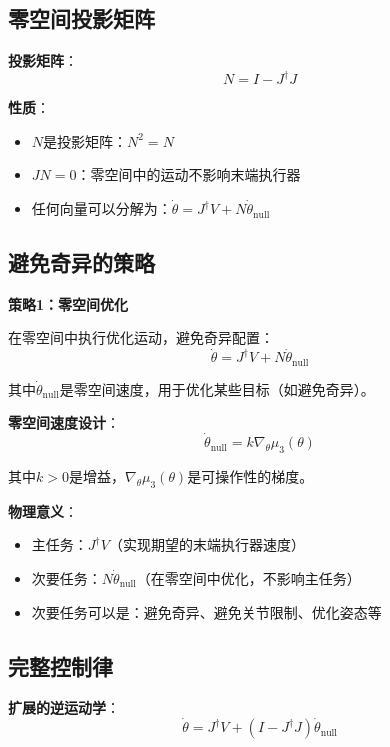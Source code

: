 \documentclass[12pt,a4paper]{article}
\begin{document}
\subsection{零空间投影矩阵}

\textbf{投影矩阵}：
\begin{equation}
N = I - J^{\dagger}J
\end{equation}

\textbf{性质}：
\begin{itemize}
\item $N$是投影矩阵：$N^2 = N$
\item $JN = 0$：零空间中的运动不影响末端执行器
\item 任何向量可以分解为：$\dot{\theta} = J^{\dagger}V + N\dot{\theta}_{\text{null}}$
\end{itemize}

\subsection{避免奇异的策略}

\textbf{策略1：零空间优化}

在零空间中执行优化运动，避免奇异配置：
\begin{equation}
\dot{\theta} = J^{\dagger}V + N\dot{\theta}_{\text{null}}
\end{equation}

其中$\dot{\theta}_{\text{null}}$是零空间速度，用于优化某些目标（如避免奇异）。

\textbf{零空间速度设计}：
\begin{equation}
\dot{\theta}_{\text{null}} = k \nabla_{\theta} \mu_3(\theta)
\end{equation}

其中$k > 0$是增益，$\nabla_{\theta} \mu_3(\theta)$是可操作性的梯度。

\textbf{物理意义}：
\begin{itemize}
\item 主任务：$J^{\dagger}V$（实现期望的末端执行器速度）
\item 次要任务：$N\dot{\theta}_{\text{null}}$（在零空间中优化，不影响主任务）
\item 次要任务可以是：避免奇异、避免关节限制、优化姿态等
\end{itemize}

\subsection{完整控制律}

\textbf{扩展的逆运动学}：
\begin{equation}
\dot{\theta} = J^{\dagger}V + (I - J^{\dagger}J)\dot{\theta}_{\text{null}}
\end{equation}
\end{document}
